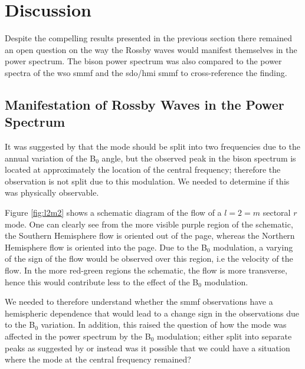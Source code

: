 \section{Discussion}\label{sec:r-mode_discussion}


Despite the compelling results presented in the previous section there remained an open question on the way the Rossby waves would manifest themselves in the power spectrum. The \gls{bison} power spectrum was also compared to the power spectra of the \gls{wso} \gls{smmf} and the \gls{sdo/hmi} \gls{smmf} to cross-reference the finding.

\subsection{Manifestation of Rossby Waves in the Power Spectrum}

It was suggested by \citet{lanza_sectoral_2019} that the mode should be split into two frequencies due to the annual variation of the B$_0$ angle, but the observed peak in the \gls{bison} spectrum is located at approximately the location of the central frequency; therefore the observation is not split due to this modulation. We needed to determine if this was physically observable.

Figure \ref{fig:l2m2} shows a schematic diagram of the flow of a $l=2=m$ sectoral $r$ mode. One can clearly see from the more visible purple region of the schematic, the Southern Hemisphere flow is oriented out of the page, whereas the Northern Hemisphere flow is oriented into the page. Due to the B$_0$ modulation, a varying of the sign of the flow would be observed over this region, i.e the velocity of the flow. In the more red-green regions the schematic, the flow is more transverse, hence this would contribute less to the effect of the B$_0$ modulation.

We needed to therefore understand whether the \gls{smmf} observations have a hemispheric dependence that would lead to a change sign in the observations due to the B$_0$ variation. In addition, this raised the question of how the mode was affected in the power spectrum by the B$_0$ modulation; either split into separate peaks as suggested by \citet{lanza_sectoral_2019} or instead was it possible that we could have a situation where the mode at the central frequency remained?

